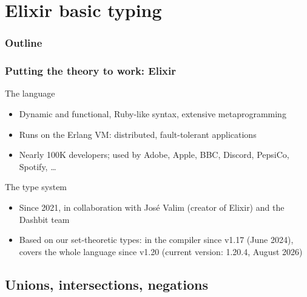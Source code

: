 
\section{Elixir basic typing}

\begin{frame}
\frametitle{Outline} 
\tableofcontents[currentsection]
\end{frame}

\begin{frame}
\frametitle{Putting the theory to work: Elixir}\vspace{-3mm}
\begin{block}{The language}
\begin{itemize}
\item Dynamic and functional, Ruby-like syntax, extensive metaprogramming
\item Runs on the Erlang VM: distributed, fault-tolerant applications
\item Nearly 100K developers; used by Adobe, Apple, BBC, Discord, PepsiCo, Spotify, \ldots
\end{itemize}
\end{block}

\begin{block}{The type system}
\begin{itemize}
\item Since 2021, in collaboration with José Valim (creator of Elixir) and the Dashbit team
\item Based on our set-theoretic types: in the compiler since v1.17 (June 2024),\\
      covers the whole language since v1.20 (current version: 1.20.4, August 2026)
\end{itemize}
\end{block}
\end{frame}


\subsection{Unions, intersections, negations}

\newcommand{\warn}{\textcolor{typeOrange}{warning:}}


